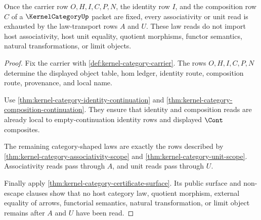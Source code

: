 \begin{theorem}
\label{thm:kernel-category-law-transport-exhaustion}
Once the carrier row $O,H,I,C,P,N$, the identity row $I$, and the composition row $C$ of a $\KernelCategoryUp$ packet are fixed, every associativity or unit read is exhausted by the law-transport rows $A$ and $U$. These law reads do not import host associativity, host unit equality, quotient morphisms, functor semantics, natural transformations, or limit objects.
\end{theorem}
\begin{proof}
Fix the carrier with \autoref{def:kernel-category-carrier}. The rows $O,H,I,C,P,N$ determine the displayed object table, hom ledger, identity route, composition route, provenance, and local name.

Use \autoref{thm:kernel-category-identity-continuation} and \autoref{thm:kernel-category-composition-continuation}. They ensure that identity and composition reads are already local to empty-continuation identity rows and displayed $\Cont$ composites.

The remaining category-shaped laws are exactly the rows described by \autoref{thm:kernel-category-associativity-scope} and \autoref{thm:kernel-category-unit-scope}. Associativity reads pass through $A$, and unit reads pass through $U$.

Finally apply \autoref{thm:kernel-category-certificate-surface}. Its public surface and non-escape clauses show that no host category law, quotient morphism, external equality of arrows, functorial semantics, natural transformation, or limit object remains after $A$ and $U$ have been read.
\end{proof}

